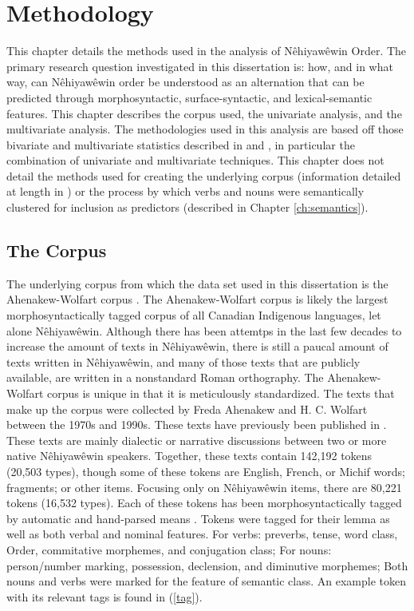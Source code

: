 	\chapter{Methodology}
	\label{ch:method}
This chapter details the methods used in the analysis of Nêhiyawêwin Order. The primary research question investigated in this dissertation is: how, and in what way, can Nêhiyawêwin order be understood as an alternation that can be predicted through morphosyntactic, surface-syntactic, and lexical-semantic features. This chapter describes the corpus used, the univariate analysis, and the multivariate analysis. The methodologies used in this analysis are based off those bivariate and multivariate statistics described in  \citet{divjak2006ways, bresnan2007predicting, gries2003multifactorial} and \citet{arppe2008univariate}, in particular the combination of univariate and multivariate techniques. This chapter does not detail the methods used for creating the underlying corpus (information detailed at length in \cite{arppe1945morphosyntactically}) or the process by which verbs and nouns were semantically clustered for inclusion as predictors (described in Chapter \ref{ch:semantics}).

\section{The Corpus}
The underlying corpus from which the data set used in this dissertation is the Ahenakew-Wolfart corpus \citep{arppe1945morphosyntactically}. The Ahenakew-Wolfart corpus is likely the largest morphosyntactically tagged corpus of all Canadian Indigenous languages, let alone Nêhiyawêwin. Although there has been attemtps in the last few decades to increase the amount of texts in Nêhiyawêwin, there is still a paucal amount of texts written in Nêhiyawêwin, and many of those texts that are publicly available, are written in a nonstandard Roman orthography. The Ahenakew-Wolfart corpus is unique in that it is meticulously standardized. The texts that make up the corpus were collected by Freda Ahenakew and H. C. Wolfart between the 1970s and 1990s. These texts have previously been published in \citet{AhenakewAlice2000, Bearetal1992, KaNipitehtew1998, Masuskapoe2010piko, Minde1997kwayask, VandallDouquette1987,Whitecalf1993}. These texts are mainly dialectic or narrative discussions between two or more native Nêhiyawêwin speakers. Together, these texts contain 142,192 tokens (20,503 types), though some of these tokens are English, French, or Michif words; fragments; or other items. Focusing only on Nêhiyawêwin items, there are 80,221 tokens (16,532 types). Each of these tokens has been morphosyntactically tagged by automatic and hand-parsed means \citep{arppe1945morphosyntactically}. Tokens were tagged for their lemma as well as both verbal and nominal features. For verbs: preverbs, tense, word class, Order, commitative morphemes, and conjugation class; For nouns: person/number marking, possession, declension, and diminutive morphemes; Both nouns and verbs were marked for the feature of semantic class. An example token with its relevant tags is found in (\ref{tag}).

